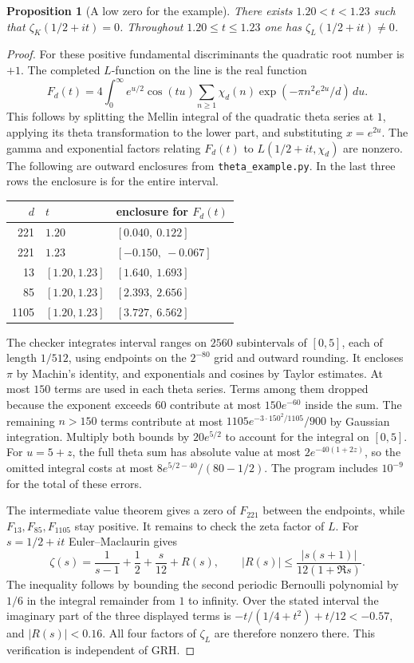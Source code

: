 \documentclass[11pt]{article}
\newtheorem{proposition}[theorem]{Proposition}
\newcommand{\dd}{\,d}\DeclareMathOperator{\sinc}{sinc}
\begin{document}
\begin{proposition}[A low zero for the example]\label{prop:example}
There exists $1.20<t<1.23$ such that $\zeta_K(1/2+it)=0$.
Throughout $1.20\le t\le1.23$ one has $\zeta_L(1/2+it)\ne0$.
\end{proposition}
\begin{proof}
For these positive fundamental discriminants the quadratic root number
is $+1$. The completed $L$-function on the line is the real function
\[
 F_d(t)=4\int_0^\infty e^{u/2}\cos(tu)
       \sum_{n\ge1}\chi_d(n)\exp(-\pi n^2 e^{2u}/d)\dd u.
\]
This follows by splitting the Mellin integral of the quadratic theta
series at $1$, applying its theta transformation to the lower part,
and substituting $x=e^{2u}$. The gamma and exponential factors relating
$F_d(t)$ to $L(1/2+it,\chi_d)$ are nonzero. The following are outward
enclosures from \texttt{theta\_example.py}. In the last three rows the
enclosure is for the entire interval.
\begin{center}
\begin{tabular}{rll}
\toprule
$d$ & $t$ & enclosure for $F_d(t)$ \\
\midrule
221 & $1.20$ & $[0.040,\ 0.122]$ \\
221 & $1.23$ & $[-0.150,\ -0.067]$ \\
13  & $[1.20,1.23]$ & $[1.640,\ 1.693]$ \\
85  & $[1.20,1.23]$ & $[2.393,\ 2.656]$ \\
1105 & $[1.20,1.23]$ & $[3.727,\ 6.562]$ \\
\bottomrule
\end{tabular}
\end{center}
The checker integrates interval ranges on $2560$ subintervals of $[0,5]$,
each of length $1/512$, using endpoints on the $2^{-80}$ grid and outward
rounding. It encloses $\pi$ by Machin's identity, and exponentials and
cosines by Taylor estimates. At most $150$ terms are used in each theta
series. Terms among them dropped because the exponent exceeds $60$
contribute at most $150e^{-60}$ inside the sum. The remaining $n>150$
terms contribute at most $1105e^{-3\cdot150^2/1105}/900$ by Gaussian
integration. Multiply both bounds by $20e^{5/2}$ to account for the
integral on $[0,5]$. For $u=5+z$, the full theta sum has absolute value
at most $2e^{-40(1+2z)}$, so the omitted integral costs at most
$8e^{5/2-40}/(80-1/2)$. The program includes $10^{-9}$ for the total
of these errors.

The intermediate value theorem gives a zero of $F_{221}$ between the
endpoints, while $F_{13},F_{85},F_{1105}$ stay positive. It remains to
check the zeta factor of $L$. For $s=1/2+it$ Euler--Maclaurin gives
\[
 \zeta(s)=\frac1{s-1}+\frac12+\frac{s}{12}+R(s),\qquad
 |R(s)|\le\frac{|s(s+1)|}{12(1+\Re s)} .
\]
The inequality follows by bounding the second periodic Bernoulli polynomial
by $1/6$ in the integral remainder from $1$ to infinity. Over the stated
interval the imaginary part of the three displayed terms is
$-t/(1/4+t^2)+t/12<-0.57$, and $|R(s)|<0.16$. All four factors of
$\zeta_L$ are therefore nonzero there. This verification is independent
of GRH.
\end{proof}
\end{document}

